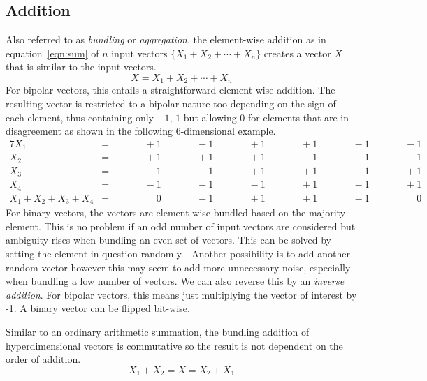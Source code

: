 \subsection{Addition} \label{sssec:add}
Also referred to as \textit{bundling} or \textit{aggregation}, the element-wise addition as in equation~\ref{eqn:sum} of $n$ input vectors $\{X_{1} + X_{2} + \cdots + X_{n}\}$ creates a vector $X$ that is similar to the input vectors.
\begin{equation}
    \label{eqn:sum}
    X = X_{1} + X_{2} + \cdots + X_{n}
\end{equation}
For bipolar vectors, this entails a straightforward element-wise addition. The resulting vector is restricted to a bipolar nature too depending on the sign of each element, thus containing only $-1$, $1$ but allowing $0$ for elements that are in disagreement as shown in the following $6$-dimensional example.
\begin{alignat*}{7}
    X_{1} &= && \qquad +1 && \qquad -1 && \qquad +1 && \qquad +1 && \qquad -1 && \qquad -1 \\
    X_{2} &= && \qquad +1 && \qquad +1 && \qquad +1 && \qquad -1 && \qquad -1 && \qquad -1 \\
    X_{3} &= && \qquad -1 && \qquad -1 && \qquad +1 && \qquad +1 && \qquad -1 && \qquad +1 \\
    X_{4} &= && \qquad -1 && \qquad -1 && \qquad -1 && \qquad +1 && \qquad -1 && \qquad +1 \\
    \hline
    X_{1} + X_{2} + X_{3} + X_{4} &= && \qquad \phantom{-}0 && \qquad -1 && \qquad +1 && \qquad +1 && \qquad -1 && \qquad \phantom{-}0
\end{alignat*}
For binary vectors, the vectors are element-wise bundled based on the majority element. This is no problem if an odd number of input vectors are considered but ambiguity rises when bundling an even set of vectors. This can be solved by setting the element in question randomly.~\cite{binBund} Another possibility is to add another random vector however this may seem to add more unnecessary noise, especially when bundling a low number of vectors. We can also reverse this by an \textit{inverse addition}. For bipolar vectors, this means just multiplying the vector of interest by -1. A binary vector can be flipped bit-wise.

Similar to an ordinary arithmetic summation, the bundling addition of hyperdimensional vectors is commutative so the result is not dependent on the order of addition.
\begin{equation}
    \label{eqn:sumcom}
    X_{1} + X_{2} = X = X_{2} + X_{1}
\end{equation}
